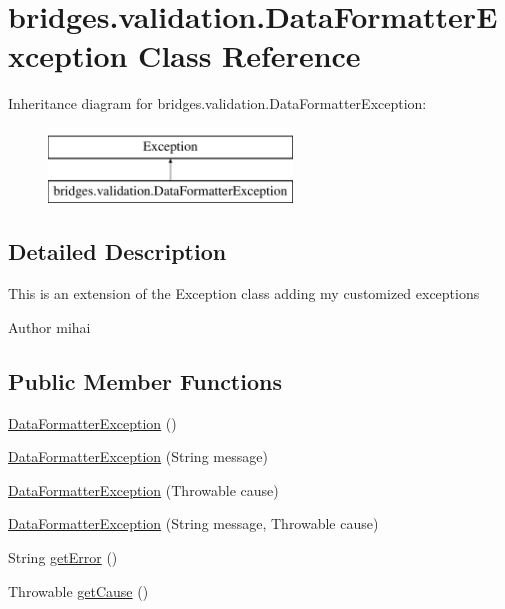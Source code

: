 \hypertarget{classbridges_1_1validation_1_1_data_formatter_exception}{}\section{bridges.\+validation.\+Data\+Formatter\+Exception Class Reference}
\label{classbridges_1_1validation_1_1_data_formatter_exception}
Inheritance diagram for bridges.\+validation.\+Data\+Formatter\+Exception\+:\begin{figure}[H]
\begin{center}
\leavevmode
\includegraphics[height=2.000000cm]{classbridges_1_1validation_1_1_data_formatter_exception}
\end{center}
\end{figure}


\subsection{Detailed Description}
This is an extension of the Exception class adding my customized exceptions \begin{DoxyAuthor}{Author}
mihai 
\end{DoxyAuthor}
\subsection*{Public Member Functions}
\begin{DoxyCompactItemize}
\item 
\mbox{\hyperlink{classbridges_1_1validation_1_1_data_formatter_exception_aa922b9fa359b89c0b25eaa1efd0cfd07}{Data\+Formatter\+Exception}} ()
\item 
\mbox{\hyperlink{classbridges_1_1validation_1_1_data_formatter_exception_abadd66eb3ea98c1af1ff397912ed73bf}{Data\+Formatter\+Exception}} (String message)
\item 
\mbox{\hyperlink{classbridges_1_1validation_1_1_data_formatter_exception_ae7ce6479c3caf8077d5e34b79fe980dd}{Data\+Formatter\+Exception}} (Throwable cause)
\item 
\mbox{\hyperlink{classbridges_1_1validation_1_1_data_formatter_exception_acaec0fe0a826d08481207a3bac21c913}{Data\+Formatter\+Exception}} (String message, Throwable cause)
\item 
String \mbox{\hyperlink{classbridges_1_1validation_1_1_data_formatter_exception_ad60457ab04769d2c80e6ba77a6307ce1}{get\+Error}} ()
\item 
Throwable \mbox{\hyperlink{classbridges_1_1validation_1_1_data_formatter_exception_a6223e92ea95f3050d532997cb115cf2a}{get\+Cause}} ()
\end{DoxyCompactItemize}
